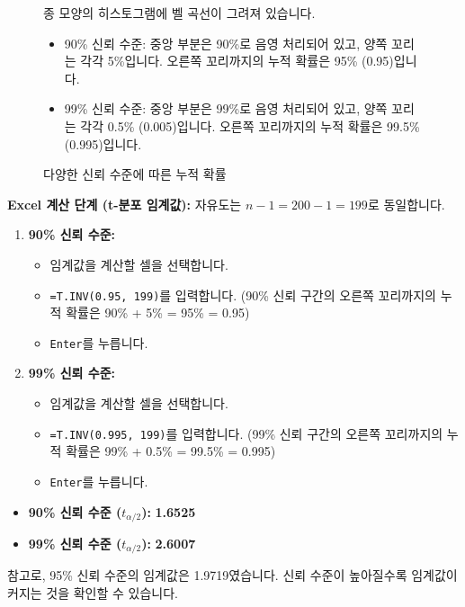 \documentclass[11pt,a4paper]{article}
\theoremstyle{definition}
\newcommand{\code}[1]{\texttt{#1}}
\begin{document}
\begin{figure}[h!]
    \centering
    \begin{warningbox}[title=그림 설명: 다양한 신뢰 수준에 따른 누적 확률]
    종 모양의 히스토그램에 벨 곡선이 그려져 있습니다.
    \begin{itemize}
        \item 90\% 신뢰 수준: 중앙 부분은 90\%로 음영 처리되어 있고, 양쪽 꼬리는 각각 5\%입니다. 오른쪽 꼬리까지의 누적 확률은 95\% (0.95)입니다.
        \item 99\% 신뢰 수준: 중앙 부분은 99\%로 음영 처리되어 있고, 양쪽 꼬리는 각각 0.5\% (0.005)입니다. 오른쪽 꼬리까지의 누적 확률은 99.5\% (0.995)입니다.
    \end{itemize}
    \end{warningbox}
    \caption{다양한 신뢰 수준에 따른 누적 확률}
    \label{fig:confidence_level_prob}
\end{figure}

\textbf{Excel 계산 단계 (t-분포 임계값):}
자유도는 $n-1 = 200-1 = 199$로 동일합니다.

\begin{enumerate}
    \item \textbf{90\% 신뢰 수준:}
        \begin{itemize}
            \item 임계값을 계산할 셀을 선택합니다.
            \item \code{=T.INV(0.95, 199)}를 입력합니다. (90\% 신뢰 구간의 오른쪽 꼬리까지의 누적 확률은 90\% + 5\% = 95\% = 0.95)
            \item \code{Enter}를 누릅니다.
        \end{itemize}
    \item \textbf{99\% 신뢰 수준:}
        \begin{itemize}
            \item 임계값을 계산할 셀을 선택합니다.
            \item \code{=T.INV(0.995, 199)}를 입력합니다. (99\% 신뢰 구간의 오른쪽 꼬리까지의 누적 확률은 99\% + 0.5\% = 99.5\% = 0.995)
            \item \code{Enter}를 누릅니다.
        \end{itemize}
\end{enumerate}
\begin{infobox}[title=계산 결과: 신뢰 수준별 t-분포 임계값]
\begin{itemize}
    \item \textbf{90\% 신뢰 수준 ($t_{\alpha/2}$):} \textbf{1.6525}
    \item \textbf{99\% 신뢰 수준 ($t_{\alpha/2}$):} \textbf{2.6007}
\end{itemize}
참고로, 95\% 신뢰 수준의 임계값은 1.9719였습니다. 신뢰 수준이 높아질수록 임계값이 커지는 것을 확인할 수 있습니다.
\end{infobox}
\end{document}

